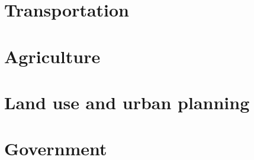 \documentclass{book}\usepackage[]{graphicx}\usepackage[]{color}
\begin{document}
\cleardoublepage
    

\chapter{Transportation}
\label{chap:transportation}





\cleardoublepage
    

\chapter{Agriculture}
\label{chap:agriculture}





\cleardoublepage
    

\chapter{Land use and urban planning}
\label{chap:land_use_urban_planning}





\cleardoublepage
    

\chapter{Government}
\label{chap:government}
\end{document}
